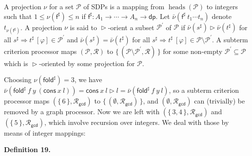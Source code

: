 \documentclass[10pt,a4paper]{amsart}
\begin{document}
A projection $\nu$ for a set $\mathcal{P}$ of SDPs is a mapping from $\operatorname{heads}(\mathcal{P})$ to integers such that $1\leq\nu(\mathsf{f}^{\sharp})\leq n$ if $\mathsf{f}^{\sharp}:{A}_{1}\rightarrow\cdots\rightarrow{A}_{n}\rightarrow\mathsf{dp}$. Let $\bar{\nu}({\mathsf{f}^{\sharp}}\ {{t}_{1}\cdots{t}_{n}})$ denote $t_{\nu(\mathsf{f}^{\sharp})}$. A projection $\nu$ is said to $\vartriangleright$-orient a subset $\mathcal{P}^{\prime}$ of $\mathcal{P}$ if $\bar{\nu}(s^{\sharp})\vartriangleright\bar{\nu}(t^{\sharp})$ for all ${s^{\sharp}}\Rightarrow{t^{\sharp}}\ [\varphi]\in\mathcal{P}^{\prime}$ and $\bar{\nu}(s^{\sharp})=\bar{\nu}(t^{\sharp})$ for all ${s^{\sharp}}\Rightarrow{t^{\sharp}}\ [\varphi]\in\mathcal{P}\setminus\mathcal{P}^{\prime}$. A subterm criterion processor maps $(\mathcal{P},\mathcal{R})$ to $\{\,(\mathcal{P}\setminus\mathcal{P}^{\prime},\mathcal{R})\,\}$ for some non-empty $\mathcal{P}^{\prime}\subseteq\mathcal{P}$ which is $\vartriangleright$-oriented by some projection for $\mathcal{P}$.\par
 
 
 
 
Choosing $\nu(\mathsf{fold}^{\sharp})=3$, we have $\bar{\nu}({{{\mathsf{fold}^{\sharp}}\ {f}}\ {y}}\ {({{\mathsf{cons}}\ {x}}\ {l})})={{\mathsf{cons}}\ {x}}\ {l}\vartriangleright l=\bar{\nu}({{{\mathsf{fold}^{\sharp}}\ {f}}\ {y}}\ {l})$, so a subterm criterion processor maps $(\{\,\text{6}\,\},\mathcal{R}_{\mathsf{gcd}})$ to $\{\,(\emptyset,\mathcal{R}_{\mathsf{gcd}})\,\}$, and $(\emptyset,\mathcal{R}_{\mathsf{gcd}})$ can (trivially) be removed by a graph processor. Now we are left with $(\{\,\text{3},\text{4}\,\},\mathcal{R}_{\mathsf{gcd}})$ and $(\{\,\text{5}\,\},\mathcal{R}_{\mathsf{gcd}})$, which involve recursion over integers. We deal with those by means of integer mappings:\par
 
 
 
\par\medskip\noindent\textbf{Definition 19.}\par
 
 
\end{document}

